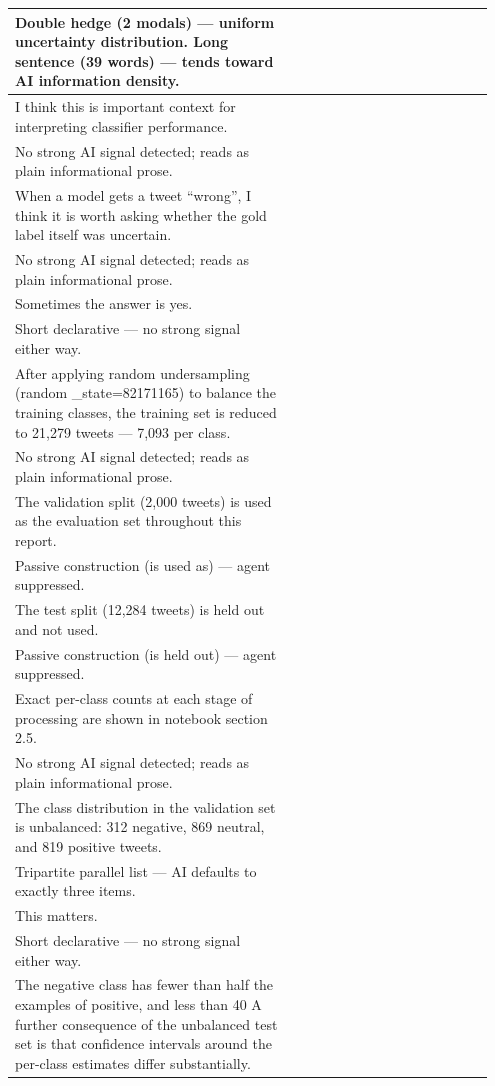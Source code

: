 \documentclass[11pt]{article}
\begin{document}
\begin{longtable}{|p{0.55\linewidth}|p{0.40\linewidth}|}
\hline
Double hedge (2 modals) --- uniform uncertainty distribution. Long sentence (39 words) --- tends toward AI information density. & \\
\hline
I think this is important context for interpreting classifier performance. & \\[2pt]
\hline
No strong AI signal detected; reads as plain informational prose. & \\
\hline
When a model gets a tweet ``wrong'', I think it is worth asking whether the gold label itself was uncertain. & \\[2pt]
\hline
No strong AI signal detected; reads as plain informational prose. & \\
\hline
Sometimes the answer is yes. & \\[2pt]
\hline
Short declarative --- no strong signal either way. & \\
\hline
After applying random undersampling (random \_state=82171165) to balance the training classes, the training set is reduced to 21,279 tweets --- 7,093 per class. & \\[2pt]
\hline
No strong AI signal detected; reads as plain informational prose. & \\
\hline
The validation split (2,000 tweets) is used as the evaluation set throughout this report. & \\[2pt]
\hline
Passive construction (is used as) --- agent suppressed. & \\
\hline
The test split (12,284 tweets) is held out and not used. & \\[2pt]
\hline
Passive construction (is held out) --- agent suppressed. & \\
\hline
Exact per-class counts at each stage of processing are shown in notebook section 2.5. & \\[2pt]
\hline
No strong AI signal detected; reads as plain informational prose. & \\
\hline
The class distribution in the validation set is unbalanced: 312 negative, 869 neutral, and 819 positive tweets. & \\[2pt]
\hline
Tripartite parallel list --- AI defaults to exactly three items. & \\
\hline
This matters. & \\[2pt]
\hline
Short declarative --- no strong signal either way. & \\
\hline
The negative class has fewer than half the examples of positive, and less than 40 A further consequence of the unbalanced test set is that confidence intervals around the per-class estimates differ substantially. & \\[2pt]

\end{longtable}
\end{document}
